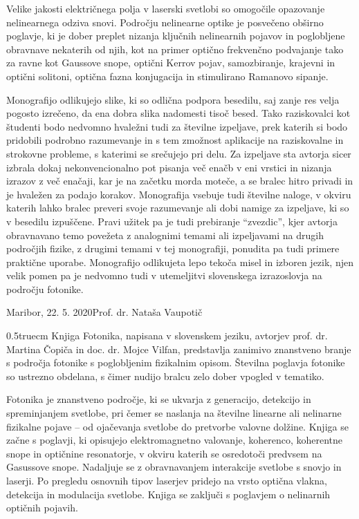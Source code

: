 \documentclass[a4paper,10pt,fleqn]{book}
\begin{document}
Velike jakosti električnega polja v laserski svetlobi so omogočile opazovanje nelinearnega odziva snovi. Področju nelinearne optike je posvečeno obširno poglavje, ki je dober preplet nizanja ključnih nelinearnih pojavov in poglobljene obravnave nekaterih od njih, kot na primer optično frekvenčno podvajanje tako za ravne kot Gaussove snope, optični Kerrov pojav, samozbiranje, krajevni in optični solitoni, optična fazna konjugacija in stimulirano Ramanovo sipanje.

Monografijo odlikujejo slike, ki so odlična podpora besedilu, saj zanje res velja pogosto izrečeno, da ena dobra slika nadomesti tisoč besed. Tako raziskovalci kot študenti bodo nedvomno hvaležni tudi za številne izpeljave, prek katerih si bodo pridobili podrobno razumevanje in s tem zmožnost aplikacije na raziskovalne in strokovne probleme, s katerimi se srečujejo pri delu. Za izpeljave sta avtorja sicer izbrala dokaj nekonvencionalno pot pisanja več enačb v eni vrstici in nizanja izrazov z več enačaji, kar je na začetku morda moteče, a se bralec hitro privadi in je hvaležen za podajo korakov. Monografija vsebuje tudi številne naloge, v okviru katerih lahko bralec preveri svoje razumevanje ali dobi namige za izpeljave, ki so v besedilu izpuščene. Pravi užitek pa je tudi prebiranje ``zvezdic'', kjer avtorja obravnavano temo povežeta z analognimi temami ali izpeljavami na drugih področjih fizike, z drugimi temami v tej monografiji, ponudita pa tudi primere praktične uporabe. Monografijo odlikujeta lepo tekoča misel in izboren jezik, njen velik pomen pa je nedvomno tudi v utemeljitvi slovenskega izrazoslovja na področju fotonike.

Maribor, 22. 5. 2020\hfill Prof. dr. Nataša Vaupotič  

\vglue0.5truecm
Knjiga Fotonika, napisana v slovenskem jeziku, avtorjev prof. dr.
Martina Čopiča in doc. dr. Mojce Vilfan, predstavlja zanimivo znanstveno branje s področja fotonike s poglobljenim fizikalnim opisom. Številna poglavja fotonike so ustrezno obdelana, s čimer nudijo bralcu zelo dober vpogled v tematiko.

Fotonika je znanstveno področje, ki se ukvarja z generacijo, detekcijo in spreminjanjem svetlobe, pri čemer se naslanja na številne linearne ali nelinarne fizikalne pojave -- od ojačevanja svetlobe do pretvorbe valovne dolžine. Knjiga se začne s poglavji, ki opisujejo elektromagnetno valovanje, koherenco, koherentne snope in optičnine resonatorje, v okviru katerih se osredotoči predvsem na Gasussove snope. Nadaljuje se z obravnavanjem interakcije svetlobe s snovjo in laserji. Po pregledu osnovnih tipov laserjev pridejo na vrsto optična vlakna, detekcija in modulacija svetlobe. Knjiga se zaključi s poglavjem o nelinarnih optičnih pojavih.
\end{document}
